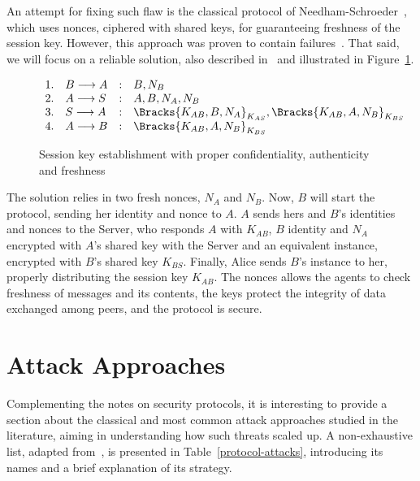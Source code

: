 An attempt for fixing such flaw is the classical protocol of Needham-Schroeder~\cite{NeedhamSchroeder78}, which uses nonces, ciphered with shared keys, for guaranteeing freshness of the session key. However, this approach was proven to contain failures~\cite{Lowe96}. That said, we will focus on a reliable solution, also described in~\cite{BoydMathuria2008} and illustrated in Figure~\ref{prt:session-key-complete}.

\begin{figure}[ht]\label{prt:session-key-complete}
  \centering
  \[
    \begin{array}{rlcl}
      1. & B \longrightarrow A &:& B, N_B \\
      2. & A \longrightarrow S &:& A, B, N_A, N_B \\
      3. & S \longrightarrow A &:& \Bracks{K_{AB}, B, N_A}_{K_{AS}}, \Bracks{K_{AB}, A, N_B}_{K_{BS}} \\
      4. & A \longrightarrow B &:& \Bracks{K_{AB}, A, N_B}_{K_{BS}} \\
    \end{array}
  \]
  \caption{Session key establishment with proper confidentiality, authenticity and freshness}
\end{figure}

The solution relies in two fresh nonces, \(N_A\) and \(N_B\). Now, \(B\) will start the protocol, sending her identity and nonce to \(A\). \(A\) sends hers and \(B\)'s identities and nonces to the Server, who responds \(A\) with \(K_{AB}\), \(B\) identity and \(N_A\) encrypted with \(A\)'s shared key with the Server and an equivalent instance, encrypted with \(B\)'s shared key \(K_{BS}\). Finally, Alice sends \(B\)'s instance to her, properly distributing the session key \(K_{AB}\). The nonces allows the agents to check freshness of messages and its contents, the keys protect the integrity of data exchanged among peers, and the protocol is secure.





\section{Attack Approaches}
Complementing the notes on security protocols, it is interesting to provide a section about the classical and most common attack approaches studied in the literature, aiming in understanding how such threats scaled up. A non-exhaustive list, adapted from~\cite{BoydMathuria2008}, is presented in Table~\ref{protocol-attacks}, introducing its names and a brief explanation of its strategy.

